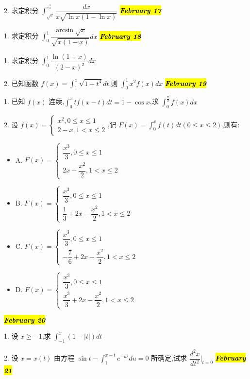 2. 求定积分 $\int_{\sqrt{e}}^{e^{\frac{3}{4}}}\dfrac{dx}{x\sqrt{\ln x(1-\ln x)}}$
\hl{\textbf{\textit{February 17}}}

1. 求定积分 $\int_{0}^{1}\dfrac{\arcsin \sqrt{x}}{\sqrt{x(1-x)}}dx$
\hl{\textbf{\textit{February 18}}}

1. 求定积分 $\int_{0}^{1}\dfrac{\ln(1+x)}{(2-x)^{2}}dx$

2. 已知函数 $f(x)=\int_{1}^{x}\sqrt{1+t^{4}}dt$,则 $\int_{0}^{1}x^{2}f(x)dx$
\hl{\textbf{\textit{February 19}}}

1. 已知 $f(x)$ 连续,$\int_{0}^{x}tf(x-t)dt=1-\cos x$,求 $\int_{0}^{\frac{\pi}{2}}f(x)dx$

2. 设 $f(x)=\begin{cases}
	x^{2},0\leq x\leq 1\\2-x, 1<x\leq 2 
\end{cases}$,记 $F(x)=\int_{0}^{x}f(t)dt(0\leq x\leq 2)$,则有:
\begin{itemize}
	\item A. $F(x)=\begin{cases}
		\dfrac{x^{3}}{3},0\leq x\leq 1\\
		2x-\dfrac{x^{2}}{2}, 1<x\leq 2
	\end{cases}$
	\item B. $F(x)=\begin{cases}
		\dfrac{x^{3}}{3},0\leq x\leq 1\\
		\dfrac{1}{3}+2x-\dfrac{x^{2}}{2}, 1<x\leq 2
	\end{cases}$
	\item C. $F(x)=\begin{cases}
		\dfrac{x^{3}}{3},0\leq x\leq 1\\
		-\dfrac{7}{6}+2x-\dfrac{x^{2}}{2}, 1<x\leq 2
	\end{cases}$
	\item D. $F(x)=\begin{cases}
		\dfrac{x^{3}}{3},0\leq x\leq 1\\
		\dfrac{x^{3}}{3}+2x-\dfrac{x^{2}}{2}, 1<x\leq 2
	\end{cases}$
\end{itemize}
\hl{\textbf{\textit{February 20}}}

1. 设 $x\geq -1$,求 $\int_{-1}^{x}(1-|t|)dt$

2. 设 $x=x(t)$ 由方程 $\sin t-\int_{1}^{x-t}e^{-u^{2}}du=0$ 所确定,试求 $\dfrac{d^{2}x}{dt^{2}}|_{t=0}$
\hl{\textbf{\textit{February 21}}}

